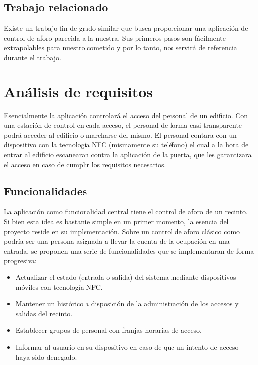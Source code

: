 \documentclass[a4paper,openright,12pt]{article}
\begin{document}
\subsection{Trabajo relacionado}
Existe un trabajo fin de grado similar \cite{Safe-Events} que busca proporcionar una aplicación de control de aforo parecida a la nuestra. Sus primeros pasos son fácilmente extrapolables para nuestro cometido y por lo tanto, nos servirá de referencia durante el trabajo.




\section{Análisis de requisitos}
Esencialmente la aplicación controlará el acceso del personal de un edificio. Con una estación de control en cada acceso, el personal de forma casi transparente podrá acceder al edificio o marcharse del mismo.
El personal contara con un dispositivo con la tecnología NFC (mismamente su teléfono) el cual a la hora de entrar al edificio escanearan contra la aplicación de la puerta, que les garantizara el acceso en caso de cumplir los requisitos necesarios.
\subsection{Funcionalidades}
La aplicación como funcionalidad central tiene el control de aforo de un recinto. Si bien esta idea es bastante simple en un primer momento, la esencia del proyecto reside en su implementación. Sobre un control de aforo clásico como podría ser una persona asignada a llevar la cuenta de la ocupación en una entrada, se proponen una serie de funcionalidades que se implementaran de forma progresiva:
\begin{itemize}
    \item Actualizar el estado (entrada o salida) del sistema mediante dispositivos móviles con tecnología NFC.
    \item Mantener un histórico a disposición de la administración de los accesos y salidas del recinto.
    \item Establecer grupos de personal con franjas horarias de acceso.
    \item Informar al usuario en su dispositivo en caso de que un intento de acceso haya sido denegado.
\end{itemize}

\end{document}
